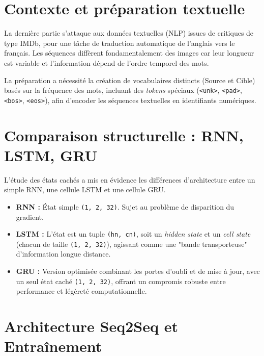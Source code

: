 
\section{Contexte et préparation textuelle}

La dernière partie s'attaque aux données textuelles (NLP) issues de critiques de type IMDb, pour une tâche de traduction automatique de l'anglais vers le français. Les séquences diffèrent fondamentalement des images car leur longueur est variable et l'information dépend de l'ordre temporel des mots. 

La préparation a nécessité la création de vocabulaires distincts (Source et Cible) basés sur la fréquence des mots, incluant des \textit{tokens} spéciaux (\texttt{<unk>}, \texttt{<pad>}, \texttt{<bos>}, \texttt{<eos>}), afin d'encoder les séquences textuelles en identifiants numériques.

\section{Comparaison structurelle : RNN, LSTM, GRU}

L'étude des états cachés a mis en évidence les différences d'architecture entre un simple RNN, une cellule LSTM et une cellule GRU. 

\begin{itemize}
    \item \textbf{RNN :} État simple \texttt{(1, 2, 32)}. Sujet au problème de disparition du gradient.
    \item \textbf{LSTM :} L'état est un tuple \texttt{(hn, cn)}, soit un \textit{hidden state} et un \textit{cell state} (chacun de taille \texttt{(1, 2, 32)}), agissant comme une "bande transporteuse" d'information longue distance.
    \item \textbf{GRU :} Version optimisée combinant les portes d'oubli et de mise à jour, avec un seul état caché \texttt{(1, 2, 32)}, offrant un compromis robuste entre performance et légèreté computationnelle.
\end{itemize}

\section{Architecture Seq2Seq et Entraînement}

